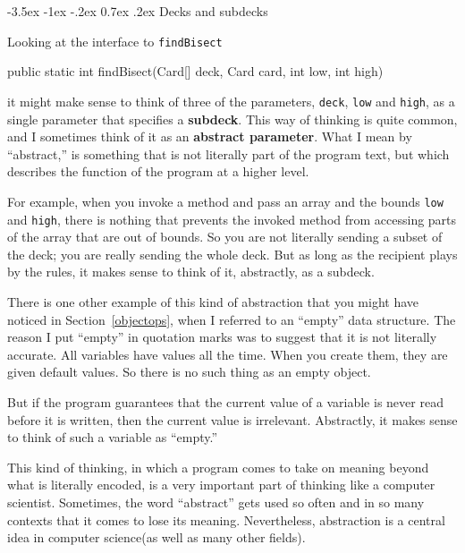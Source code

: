 \documentclass{book}
\makeatletter
\renewcommand{\section}{\@startsection 
    {section} {1} {0mm}%
    {-3.5ex \@plus -1ex \@minus -.2ex}%
    {0.7ex \@plus.2ex}%
    {\normalfont\Large\bfseries}}
\makeatother
\begin{document}


\section{Decks and subdecks}

Looking at the interface to {\tt findBisect}

\begin{verbatimtab}
public static int findBisect(Card[] deck, Card card, int low, int high)
\end{verbatimtab}


it might make sense to think of three of the parameters, {\tt deck},
{\tt low} and {\tt high}, as a single parameter that specifies a {\bf
subdeck}.  This way of thinking is quite common, and I sometimes think
of it as an {\bf abstract parameter}.  What I mean by ``abstract,'' is
something that is not literally part of the program text, but which
describes the function of the program at a higher level.

For example, when you invoke a method and pass an array and the bounds
{\tt low} and {\tt high}, there is nothing that prevents the invoked
method from accessing parts of the array that are out of bounds.  So
you are not literally sending a subset of the deck; you are really
sending the whole deck.  But as long as the recipient plays by the
rules, it makes sense to think of it, abstractly, as a subdeck.

There is one other example of this kind of abstraction that you might
have noticed in Section~\ref{objectops}, when I referred to an
``empty'' data structure.  The reason I put ``empty'' in quotation
marks was to suggest that it is not literally accurate.  All variables
have values all the time.  When you create them, they are given
default values.  So there is no such thing as an empty object.

But if the program guarantees that the current value of a variable is
never read before it is written, then the current value is irrelevant.
Abstractly, it makes sense to think of such a variable as ``empty.''

This kind of thinking, in which a program comes to take on meaning
beyond what is literally encoded, is a very important part of thinking
like a computer scientist.  Sometimes, the word ``abstract'' gets used
so often and in so many contexts that it comes to lose its meaning.
Nevertheless, abstraction is a central idea in computer science(as
well as many other fields).
\end{document}
